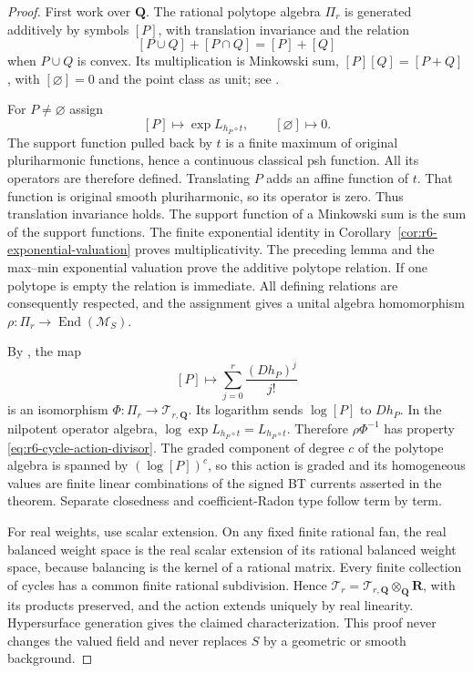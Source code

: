 \documentclass[11pt,a4paper]{article}
\numberwithin{equation}{section}
\theoremstyle{definition}
\theoremstyle{remark}
\begin{document}
\begin{proof}
First work over $\mathbf Q$. The rational polytope algebra
$\Pi_r$ is generated additively by symbols $[P]$, with
translation invariance and the relation
\[
 [P\cup Q]+[P\cap Q]=[P]+[Q]
\]
when $P\cup Q$ is convex. Its multiplication is Minkowski
sum, $[P][Q]=[P+Q]$, with $[\varnothing]=0$ and the point
class as unit; see \cite[Section 5, p.~19]{JY16}.

For $P\ne\varnothing$ assign
\[
                  [P]\longmapsto\exp L_{h_P\circ t},
 \qquad [\varnothing]\longmapsto0.
\]
The support function pulled back by $t$ is a finite maximum
of original pluriharmonic functions, hence a continuous
classical psh function. All its operators are therefore
defined. Translating $P$ adds an affine function of $t$.
That function is original smooth pluriharmonic, so its
operator is zero. Thus translation invariance holds.
The support function of a Minkowski sum is the sum of the
support functions. The finite exponential identity in
Corollary~\ref{cor:r6-exponential-valuation} proves
multiplicativity. The preceding lemma and the max--min
exponential valuation prove the additive polytope relation.
If one polytope is empty the relation is immediate. All
defining relations are consequently respected, and the
assignment gives a unital algebra homomorphism
$\rho:\Pi_r\to\operatorname{End}(\mathscr M_S)$.

By \cite[Theorem 5.1, pp.~19--20]{JY16}, the map
\[
 [P]\longmapsto
       \sum_{j=0}^{r}\frac{(D h_P)^j}{j!}
\]
is an isomorphism $\Phi:\Pi_r\to\mathcal T_{r,\mathbf Q}$.
Its logarithm sends $\log[P]$ to $D h_P$. In the nilpotent
operator algebra, $\log\exp L_{h_P\circ t}=L_{h_P\circ t}$.
Therefore $\rho\Phi^{-1}$ has property
\eqref{eq:r6-cycle-action-divisor}. The graded component of
degree $c$ of the polytope algebra is spanned by
$(\log[P])^c$, so this action is graded and its homogeneous
values are finite linear combinations of the signed BT
currents asserted in the theorem. Separate closedness and
coefficient-Radon type follow term by term.

For real weights, use scalar extension. On any fixed finite
rational fan, the real balanced weight space is the real
scalar extension of its rational balanced weight space,
because balancing is the kernel of a rational matrix.
Every finite collection of cycles has a common finite
rational subdivision. Hence
$\mathcal T_r=\mathcal T_{r,\mathbf Q}\otimes_{\mathbf Q}\mathbf R$,
with its products preserved, and the action extends
uniquely by real linearity. Hypersurface generation gives
the claimed characterization. This proof never changes
the valued field and never replaces $S$ by a geometric
or smooth background.
\end{proof}
\end{document}
